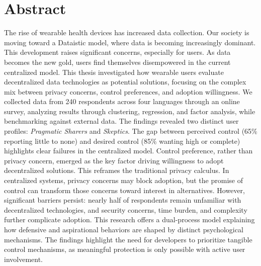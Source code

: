 \documentclass[12pt,a4paper]{article}
\begin{document}
    


    \setcounter{page}{1}

    \section*{Abstract}
    The rise of wearable health devices has increased data collection. Our society is moving toward a Dataistic model, where data is becoming increasingly dominant. This development raises significant concerns, especially for users. As data becomes the new gold, users find themselves disempowered in the current centralized model. This thesis investigated how wearable users evaluate decentralized data technologies as potential solutions, focusing on the complex mix between privacy concerns, control preferences, and adoption willingness.
    We collected data from 240 respondents across four languages through an online survey, analyzing results through clustering, regression, and factor analysis, while benchmarking against external data. The findings revealed two distinct user profiles: \textit{Pragmatic Sharers} and \textit{Skeptics}. The gap between perceived control (65\% reporting little to none) and desired control (85\% wanting high or complete) highlights clear failures in the centralized model.
    Control preference, rather than privacy concern, emerged as the key factor driving willingness to adopt decentralized solutions. This reframes the traditional privacy calculus. In centralized systems, privacy concerns may block adoption, but the promise of control can transform those concerns toward interest in alternatives. However, significant barriers persist: nearly half of respondents remain unfamiliar with decentralized technologies, and security concerns, time burden, and complexity further complicate adoption.
    This research offers a dual-process model explaining how defensive and aspirational behaviors are shaped by distinct psychological mechanisms. The findings highlight the need for developers to prioritize tangible control mechanisms, as meaningful protection is only possible with active user involvement.
    \clearpage
\end{document}
